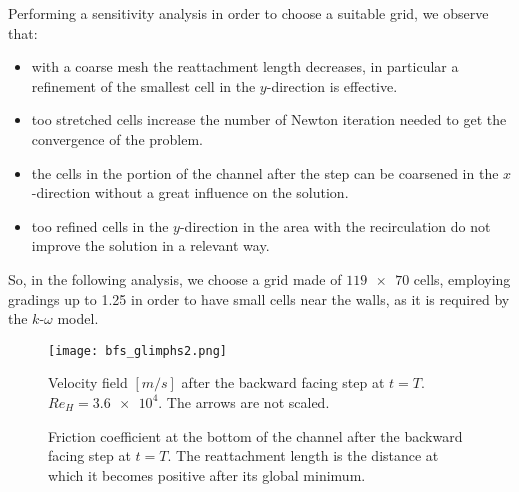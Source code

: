 Performing a sensitivity analysis in order to choose a suitable grid, we observe that:
\begin{itemize}
	\item with a coarse mesh the reattachment length decreases, in particular a refinement of the smallest cell in the $y$-direction is effective.
	\item too stretched cells increase the number of Newton iteration needed to get the convergence of the problem.
	\item the cells in the portion of the channel after the step can be coarsened in the $x$-direction without a great influence on the solution.
	\item too refined cells in the $y$-direction in the area with the 
	recirculation do not improve the solution in a relevant way.
\end{itemize}
So, in the following analysis, we choose a grid made of $\num{119x70}$ cells, employing gradings up to 1.25 in order to have small cells near the walls, as it is required by the $k\text{-}\omega$ model.

\begin{figure} %
	\centering
	\texttt{[image: bfs\_glimphs2.png]}
	\caption[Velocity field after the backward facing step]{Velocity field $[\si{m/s}]$ after the backward facing step at $t=T$. $Re_H=\num{3.6e4}$. The arrows are not scaled.}
	\label{fig:bfsarrows}
\end{figure}
\begin{figure}
	\centering
	
	\caption[Friction coefficient in the backward facing step test]{Friction coefficient at the bottom of the channel after the backward facing step at $t=T$. The reattachment length is the distance at which it becomes positive after its global minimum.}
	\label{fig:bfscf}
\end{figure}

